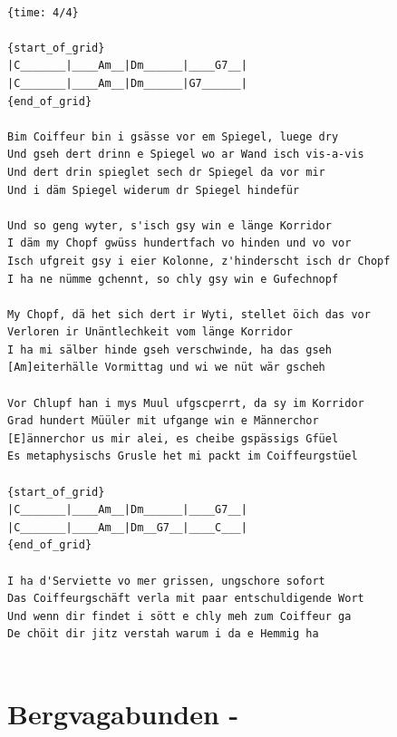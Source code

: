 \documentclass[]{book}
\let\stdsection\section
\renewcommand\section{\clearpage\stdsection}
\begin{document}
\begin{verbatim}

{time: 4/4}

{start_of_grid}
|C_______|____Am__|Dm______|____G7__|
|C_______|____Am__|Dm______|G7______|
{end_of_grid}

Bim Coiffeur bin i gsässe vor em Spiegel, luege dry
Und gseh dert drinn e Spiegel wo ar Wand isch vis-a-vis
Und dert drin spieglet sech dr Spiegel da vor mir
Und i däm Spiegel widerum dr Spiegel hindefür

Und so geng wyter, s'isch gsy win e länge Korridor
I däm my Chopf gwüss hundertfach vo hinden und vo vor
Isch ufgreit gsy i eier Kolonne, z'hinderscht isch dr Chopf
I ha ne nümme gchennt, so chly gsy win e Gufechnopf

My Chopf, dä het sich dert ir Wyti, stellet öich das vor
Verloren ir Unäntlechkeit vom länge Korridor
I ha mi sälber hinde gseh verschwinde, ha das gseh
[Am]eiterhälle Vormittag und wi we nüt wär gscheh

Vor Chlupf han i mys Muul ufgscperrt, da sy im Korridor
Grad hundert Müüler mit ufgange win e Männerchor
[E]ännerchor us mir alei, es cheibe gspässigs Gfüel
Es metaphysischs Grusle het mi packt im Coiffeurgstüel

{start_of_grid}
|C_______|____Am__|Dm______|____G7__|
|C_______|____Am__|Dm__G7__|____C___| 
{end_of_grid}

I ha d'Serviette vo mer grissen, ungschore sofort
Das Coiffeurgschäft verla mit paar entschuldigende Wort
Und wenn dir findet i sött e chly meh zum Coiffeur ga
De chöit dir jitz verstah warum i da e Hemmig ha


\end{verbatim}

\hypertarget{bergvagabunden--}{%
\section{Bergvagabunden -}\label{bergvagabunden--}}
\end{document}
